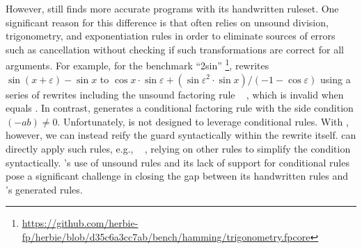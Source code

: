 However, \herbie still finds more accurate programs
  with its handwritten ruleset.
One significant reason for this difference is that
  \herbie often relies on unsound
  division, trigonometry, and exponentiation rules in order
  to eliminate sources of errors
  such as cancellation without checking if
  such transformations are correct for all arguments.
For example,
  for the benchmark ``2sin''%
  \footnote{\url{https://github.com/herbie-fp/herbie/blob/d35c6a3cc7ab/bench/hamming/trigonometry.fpcore}},
 \herbie rewrites
 $\sin \left(x + \varepsilon\right) - \sin x$ to
 $\cos x \cdot \sin \varepsilon + ({\sin \varepsilon}^{2} \cdot \sin x)/(-1 - \cos \varepsilon)$
 using a series of rewrites including the unsound
 factoring rule
  \rewritesto ~ ,
 which is invalid when  equals .
In contrast, \enumo generates a conditional
  factoring rule with the side condition $(- a b) \neq 0$.
Unfortunately, \herbie is not designed to leverage conditional rules.
With \enumo, however, we can instead reify the guard syntactically
  within the rewrite itself.
\herbie can directly apply such rules, e.g.,
  \rewritesto ~
  ,
relying on other rules to simplify the condition syntactically.
\herbie's use of unsound rules and its lack of support
  for conditional rules pose a significant challenge in
  closing the gap between its handwritten rules
  and \enumo's generated rules.

